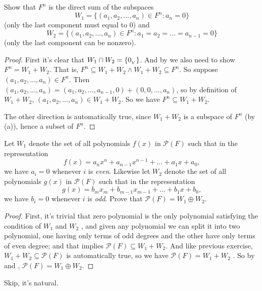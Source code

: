 \begin{exercise} \label{exercise 1.3.24}
Show that \(F^n\) is the direct sum of the subspaces
\[
    W_1 = \{(a_1, a_2, ..., a_n) \in F^n : a_n = 0 \}
\]
(only the last component must equal to \(0\)) and
\[
    W_2 = \{(a_1, a_2, ..., a_n) \in F^n : a_1 = a_2 = ... = a_{n - 1} = 0 \}
\]
(only the last component can be nonzero).
\end{exercise}

\begin{proof}
First it's clear that \(W_1 \cap W_2 = \{ 0_{_V} \}\).
And by  we also need to show \(F^n = W_1 + W_2\).
That is, \(F^n \subseteq W_1 + W_2 \land W_1 + W_2 \subseteq F^n\).
So suppose \((a_1, a_2, ..., a_n) \in F^n\).
Then \((a_1, a_2, ..., a_n) = (a_1, a_2, ..., a_{n - 1}, 0) + (0, 0, ..., a_n)\), so by definition of \(W_1 + W_2\), \((a_1, a_2, ..., a_n) \in W_1 + W_2\).
So we have \(F^n \subseteq W_1 + W_2\).

The other direction is automatically true, since \(W_1 + W_2\) is a subspace of \(F^n\) (by (a)), hence a subset of \(F^n\).
\end{proof}

\begin{exercise} \label{exercise 1.3.25}
Let \(W_1\) denote the set of all polynomials \(f(x)\) in \(\mathcal{P}(F)\) such that in the representation
\[
    f(x) = a_n x^n + a_{n - 1} x^{n - 1} + ... + a_1 x + a_0,
\]
we have \(a_i = 0\) whenever \(i\) is \emph{even}.
Likewise let \(W_2\) denote the set of all polynomials \(g(x)\) in \(\mathcal{P}(F)\) such that in the representation
\[
    g(x) = b_m x_m + b_{m - 1} x_{m - 1} + ... + b_1 x + b_0,
\]
we have \(b_i = 0\) whenever \(i\) is \emph{odd}.
Prove that \(\mathcal{P}(F) = W_1 \oplus W_2\).
\end{exercise}

\begin{proof}
First, it's trivial that zero polynomial is the only polynomial satisfying the condition of \(W_1\) and \(W_2\) ,
and given any polynomial we can split it into two polynomial, one having only terms of odd degrees and the other have only terms of even degree;
and that implies \(\mathcal{P}(F) \subseteq W_1 + W_2\).
And like previous exercise, \(W_1 + W_2 \subseteq \mathcal{P}(F)\) is automatically true, so we have \(\mathcal{P}(F) = W_1 + W_2\) .
So by  and , \(\mathcal{P}(F) = W_1 \oplus W_2\).
\end{proof}

\begin{exercise} \label{exercise 1.3.26}
Skip, it's natural.
\end{exercise}

